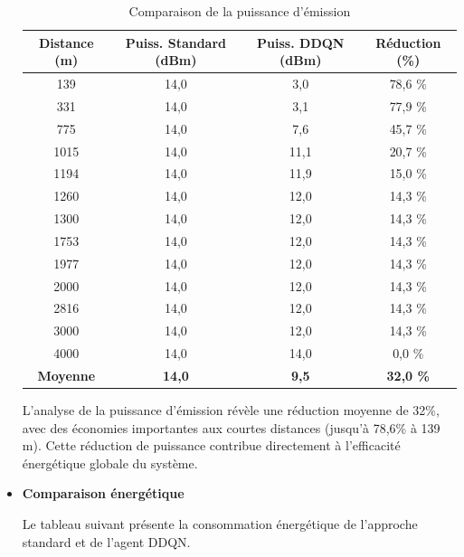 \begin{itemize}
	\begin{table}[H]
		\centering
		\caption{Comparaison de la puissance d'émission}
		\label{tab:comparaison-puissance}
		\begin{tabular}{|c|c|c|c|}
			\hline
			\textbf{Distance (m)} & \textbf{Puiss. Standard (dBm)} & \textbf{Puiss. DDQN (dBm)} & \textbf{Réduction (\%)} \\
			\hline
			\hline
			139  & 14,0 & 3,0  & 78,6 \% \\
			\hline
			331  & 14,0 & 3,1  & 77,9 \% \\
			\hline
			775  & 14,0 & 7,6  & 45,7 \% \\
			\hline
			1015 & 14,0 & 11,1 & 20,7 \% \\
			\hline
			1194 & 14,0 & 11,9 & 15,0 \% \\
			\hline
			1260 & 14,0 & 12,0 & 14,3 \% \\
			\hline
			1300 & 14,0 & 12,0 & 14,3 \% \\
			\hline
			1753 & 14,0 & 12,0 & 14,3 \% \\
			\hline
			1977 & 14,0 & 12,0 & 14,3 \% \\
			\hline
			2000 & 14,0 & 12,0 & 14,3 \% \\
			\hline
			2816 & 14,0 & 12,0 & 14,3 \% \\
			\hline
			3000 & 14,0 & 12,0 & 14,3 \% \\
			\hline
			4000 & 14,0 & 14,0 & 0,0 \% \\
			\hline
			\hline
			\textbf{Moyenne} & \textbf{14,0} & \textbf{9,5} & \textbf{32,0 \%} \\
			\hline
		\end{tabular}
	\end{table}
	
	L'analyse de la puissance d'émission révèle une réduction moyenne de 32\%, avec des économies importantes aux courtes distances (jusqu'à 78,6\% à 139 m). Cette réduction de puissance contribue directement à l'efficacité énergétique globale du système.
	
	\newpage
	\item \textbf{Comparaison énergétique}
	
	Le tableau suivant présente la consommation énergétique de l'approche standard et de l'agent DDQN.
	

\end{itemize}
